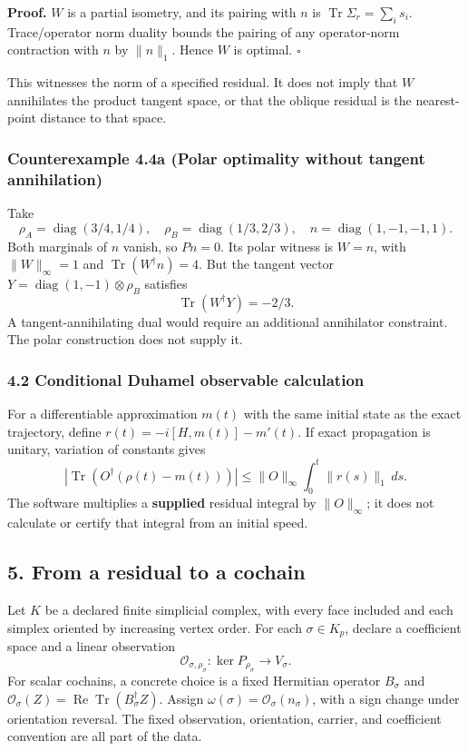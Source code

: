 \documentclass[
  11pt,
]{article}
\begin{document}
\textbf{Proof.} \(W\) is a partial isometry, and its pairing with \(n\) is
\(\operatorname{Tr}\Sigma_r=\sum_i s_i\). Trace/operator norm duality
bounds the pairing of any operator-norm contraction with \(n\) by
\(\|n\|_1\). Hence \(W\) is optimal. \(\square\)

This witnesses the norm of a specified residual. It does not imply that
\(W\) annihilates the product tangent space, or that the oblique residual
is the nearest-point distance to that space.

\subsubsection{Counterexample 4.4a (Polar optimality without tangent annihilation)}\label{counterexample-4.4a-polar-optimality-without-tangent-annihilation}

Take
\[
\rho_A=\operatorname{diag}(3/4,1/4),\quad
\rho_B=\operatorname{diag}(1/3,2/3),\quad
n=\operatorname{diag}(1,-1,-1,1).
\]
Both marginals of \(n\) vanish, so \(Pn=0\).
Its polar witness is \(W=n\), with \(\|W\|_\infty=1\) and
\(\operatorname{Tr}(W^\dagger n)=4\).
But the tangent vector
\(Y=\operatorname{diag}(1,-1)\otimes\rho_B\) satisfies
\[
\operatorname{Tr}(W^\dagger Y)=-2/3.
\]
A tangent-annihilating dual would require an additional annihilator
constraint. The polar construction does not supply it.

\subsubsection{4.2 Conditional Duhamel observable calculation}\label{conditional-duhamel-observable-calculation}

For a differentiable approximation \(m(t)\) with the same initial state as
the exact trajectory, define \(r(t)=-i[H,m(t)]-m'(t)\).
If exact propagation is unitary, variation of constants gives
\[
|\operatorname{Tr}(O^\dagger(\rho(t)-m(t)))|
 \le\|O\|_\infty\int_0^t\|r(s)\|_1\,ds.
\]
The software multiplies a \textbf{supplied} residual integral by \(\|O\|_\infty\);
it does not calculate or certify that integral from an initial speed.

\subsection{5. From a residual to a cochain}\label{from-a-residual-to-a-cochain}

Let \(K\) be a declared finite simplicial complex, with every face included
and each simplex oriented by increasing vertex order. For each
\(\sigma\in K_p\), declare a coefficient space and a linear observation
\[
\mathcal O_{\sigma,\rho_\sigma}:
\ker P_{\rho_\sigma}\longrightarrow V_\sigma.
\]
For scalar cochains, a concrete choice is a fixed Hermitian operator
\(B_\sigma\) and
\(\mathcal O_\sigma(Z)=\operatorname{Re}\operatorname{Tr}(B_\sigma^\dagger Z)\).
Assign
\(\omega(\sigma)=\mathcal O_\sigma(n_\sigma)\), with a sign change under
orientation reversal. The fixed observation, orientation, carrier, and
coefficient convention are all part of the data.
\end{document}
